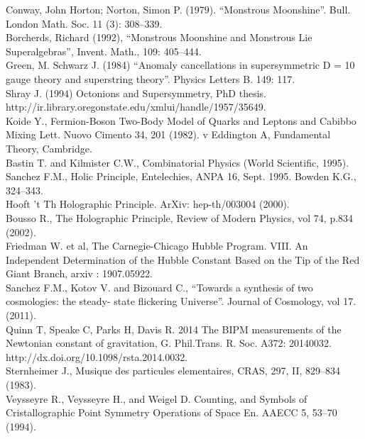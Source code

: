 \documentclass[preprint,12pt]{elsarticle}
\begin{document}
\begin{thebibliography}{99}
 Conway, John Horton; Norton, Simon P. (1979). ``Monstrous Moonshine''. Bull. London Math. Soc. 11 (3): 308--339.\\
 Borcherds, Richard (1992), ``Monstrous Moonshine and Monstrous Lie Superalgebras'', Invent. Math., 109: 405--444.\\ 
 Green, M. Schwarz J. (1984)  ``Anomaly cancellations in supersymmetric D = 10 gauge theory and superstring theory''. Physics Letters B. 149: 117.\\
 Shray J. (1994) Octonions and Supersymmetry, PhD thesis.  http://ir.library.oregonstate.edu/xmlui/handle/1957/35649. \\
 Koide Y., Fermion-Boson Two-Body Model of Quarks and Leptons and Cabibbo Mixing  Lett. Nuovo Cimento 34, 201 (1982). v 
 Eddington A, Fundamental Theory, Cambridge.\\
 Bastin T. and Kilmister C.W., Combinatorial Physics (World Scientific, 1995).\\
  Sanchez F.M., Holic Principle, Entelechies, ANPA 16, Sept. 1995. Bowden K.G., 324--343.\\
 Hooft 't Th Holographic Principle. ArXiv: hep-th/003004 (2000). \\
 Bousso R., The Holographic Principle, Review of Modern Physics, vol 74, p.834 (2002).\\
 Friedman W. et al, The Carnegie-Chicago Hubble Program. VIII. An Independent Determination of the Hubble Constant Based on the Tip of the Red Giant Branch, arxiv : 1907.05922.\\ 
 Sanchez F.M., Kotov V. and Bizouard C., ``Towards a synthesis of two cosmologies: the steady- state flickering Universe''. Journal of Cosmology, vol 17. (2011).\\
 Quinn T, Speake C, Parks H, Davis R. 2014 The BIPM measurements of the Newtonian constant of gravitation, G. Phil.Trans. R. Soc. A372: 20140032. http://dx.doi.org/10.1098/rsta.2014.0032. \\
 Sternheimer J., Musique des particules elementaires, CRAS, 297, II, 829--834 (1983).\\
 Veysseyre R., Veysseyre H., and Weigel D. Counting, and Symbols of Cristallographic Point Symmetry Operations of Space En. AAECC 5, 53--70 (1994).\\

\end{thebibliography}
\end{document}

